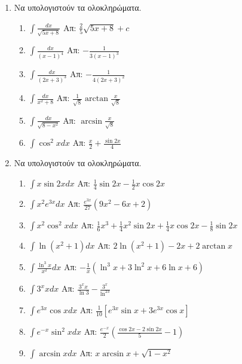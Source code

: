 \documentclass[a4paper]{article}
\theoremstyle{definition}
\theoremstyle{remark}
\begin{document}
\begin{center}
\end{center}
\vspace{1cm}
\renewcommand{\theenumii}{\roman{enumii}}
\begin{enumerate}

\item Να υπολογιστούν τα ολοκληρώματα.


\begin{enumerate}
\item $\int \frac{dx}{\sqrt{5x+8}}$ \hfill Απ: $\frac{2}{5}\sqrt{5x+8}+c$
\item $\int\frac{dx}{(x-1)^4}$ \hfill Απ: $-\frac{1}{3(x-1)^3}$
\item $\int\frac{dx}{(2x+3)^3}$ \hfill Απ: $-\frac{1}{4(2x+3)^2}$
\item $\int\frac{dx}{x^2+8}$ \hfill Απ: $\frac{1}{\sqrt{8}} \arctan \frac{x}{\sqrt{8}}$
\item $\int\frac{dx}{\sqrt{8-x^2}}$ \hfill Απ: $\arcsin \frac{x}{\sqrt{8}}$

\item $\int \cos^2xdx$ \hfill Απ: $\frac{x}{2} + \frac{\sin2x}{4}$
\end{enumerate}

\item Να υπολογιστούν τα ολοκληρώματα.

\begin{enumerate}
\item $\int x\sin2xdx$ \hfill Απ: $\frac{1}{4}\sin2x-\frac{1}{2}x\cos2x$
\item $\int x^2e^{3x}dx$ \hfill Απ: $\frac{e^{3x}}{27}(9x^2-6x+2)$
\item $\int x^2\cos^2x dx$ \hfill Απ: $\frac{1}{6}x^3 + \frac{1}{4}x^2\sin2x+\frac{1}{4}x\cos2x-\frac{1}{8}\sin2x$ 
\item $\int \ln(x^{2}+1) dx $ \hfill Απ: $2\ln(x^{2}+1)-2x+2\arctan x$
\item $\int \frac{\ln^3x}{x^2}dx$ \hfill Απ: $-\frac{1}{x}(\ln^3x+3\ln^2x+6\ln x+6)$
\item $\int 3^xxdx$ \hfill Απ: $\frac{3^xx}{\ln3}-\frac{3^x}{\ln^23}$
\item $\int e^{3x}\cos x dx$ \hfill Απ: $\frac{1}{10}[e^{3x}\sin x + 3e^{3x}\cos x]$
\item $\int e^{-x}\sin^2xdx$ \hfill Απ: $\frac{e^{-x}}{2}\left(\frac{\cos2x-2\sin2x}{5}-1\right)$
\item $\int \arcsin x dx$ \hfill Απ: $x\arcsin x + \sqrt{1-x^2}$
\end{enumerate}


\end{enumerate}
\end{document}
